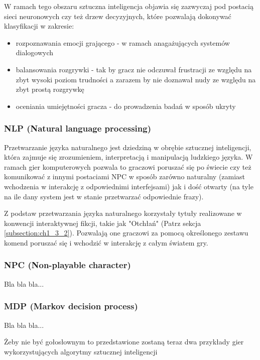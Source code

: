W ramach tego obszaru sztuczna inteligencja objawia się zazwyczaj pod postacią sieci neuronowych czy
też drzew decyzyjnych, które pozwalają dokonywać klasyfikacji w zakresie\cite{reusable_game_ai}:

\begin{itemize}
    \item rozpoznawania emocji grającego - w ramach anagażujących systemów dialogowych
    \item balansowania rozgrywki - tak by gracz nie odczuwał frustracji ze względu na zbyt wysoki poziom
          trudności a zarazem by nie doznawał nudy ze względu na zbyt prostą rozgrywkę
    \item oceniania umiejętności gracza - do prowadzenia badań w sposób ukryty
\end{itemize}

\subsubsection*{NLP (Natural language processing)}

Przetwarzanie języka naturalnego jest dziedziną w obrębie sztucznej inteligencji, która zajmuje się
zrozumieniem, interpretacją i manipulacją ludzkiego języka\cite{reusable_game_ai}. W ramach gier
komputerowych pozwala to graczowi poruszać się po świecie czy też komunikować z innymi postaciami NPC
w sposób zarówno naturalny (zamiast wchodzenia w interakcję z odpowiednimi interfejsami) jak i dość
otwarty (na tyle na ile dany system jest w stanie przetwarzać odpowiednie frazy).

Z podstaw przetwarzania języka naturalnego korzystały tytuły realizowane w konwencji interaktywnej
fikcji, takie jak "Otchłań" (Patrz sekcja \ref{subsection:ch1_3_2}). Pozwalają one graczowi za pomocą
określonego zestawu komend poruszać się i wchodzić w interakcję z całym światem gry.

\subsubsection*{NPC (Non-playable character)}

Bla bla bla...

\subsubsection*{MDP (Markov decision process)}

Bla bla bla...

Żeby nie być gołosłownym to przedstawione zostaną teraz dwa przykłady gier wykorzystujących
algorytmy sztucznej inteligencji

